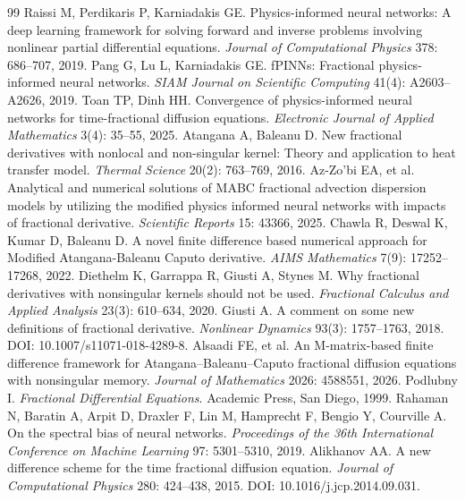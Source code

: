 \documentclass[11pt]{article}
\begin{document}
\begin{thebibliography}{99}
 Raissi M, Perdikaris P, Karniadakis GE. Physics-informed neural networks: A deep learning framework for solving forward and inverse problems involving nonlinear partial differential equations. \emph{Journal of Computational Physics} 378: 686--707, 2019.
 Pang G, Lu L, Karniadakis GE. fPINNs: Fractional physics-informed neural networks. \emph{SIAM Journal on Scientific Computing} 41(4): A2603--A2626, 2019.
 Toan TP, Dinh HH. Convergence of physics-informed neural networks for time-fractional diffusion equations. \emph{Electronic Journal of Applied Mathematics} 3(4): 35--55, 2025.
 Atangana A, Baleanu D. New fractional derivatives with nonlocal and non-singular kernel: Theory and application to heat transfer model. \emph{Thermal Science} 20(2): 763--769, 2016.
 Az-Zo'bi EA, et al. Analytical and numerical solutions of MABC fractional advection dispersion models by utilizing the modified physics informed neural networks with impacts of fractional derivative. \emph{Scientific Reports} 15: 43366, 2025.
 Chawla R, Deswal K, Kumar D, Baleanu D. A novel finite difference based numerical approach for Modified Atangana-Baleanu Caputo derivative. \emph{AIMS Mathematics} 7(9): 17252--17268, 2022.
 Diethelm K, Garrappa R, Giusti A, Stynes M. Why fractional derivatives with nonsingular kernels should not be used. \emph{Fractional Calculus and Applied Analysis} 23(3): 610--634, 2020.
 Giusti A. A comment on some new definitions of fractional derivative. \emph{Nonlinear Dynamics} 93(3): 1757--1763, 2018. DOI: 10.1007/s11071-018-4289-8.
 Alsaadi FE, et al. An M-matrix-based finite difference framework for Atangana--Baleanu--Caputo fractional diffusion equations with nonsingular memory. \emph{Journal of Mathematics} 2026: 4588551, 2026.
 Podlubny I. \emph{Fractional Differential Equations}. Academic Press, San Diego, 1999.
 Rahaman N, Baratin A, Arpit D, Draxler F, Lin M, Hamprecht F, Bengio Y, Courville A. On the spectral bias of neural networks. \emph{Proceedings of the 36th International Conference on Machine Learning} 97: 5301--5310, 2019.
 Alikhanov AA. A new difference scheme for the time fractional diffusion equation. \emph{Journal of Computational Physics} 280: 424--438, 2015. DOI: 10.1016/j.jcp.2014.09.031.

\end{thebibliography}
\end{document}
